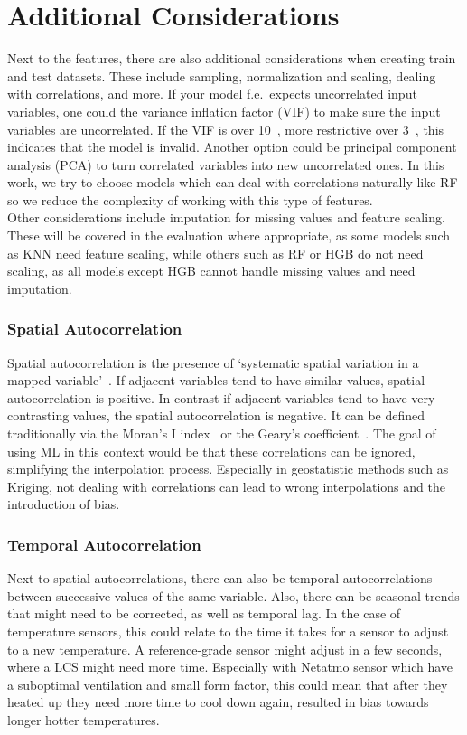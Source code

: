 \section{Additional Considerations}

Next to the features, there are also additional considerations when creating train and test datasets. These include sampling, normalization and scaling, dealing with correlations, and more. If your model f.e.\ expects uncorrelated input variables, one could the variance inflation factor (VIF) to make sure the input variables are uncorrelated. If the VIF is over 10~\cite{montgomery2021introduction}, more restrictive over 3~\cite{zuur2010protocol}, this indicates that the model is invalid. Another option could be principal component analysis (PCA) to turn correlated variables into new uncorrelated ones. In this work, we try to choose models which can deal with correlations naturally like RF so we reduce the complexity of working with this type of features.\\
Other considerations include imputation for missing values and feature scaling. These will be covered in the evaluation where appropriate, as some models such as KNN need feature scaling, while others such as RF or HGB do not need scaling, as all models except HGB cannot handle missing values and need imputation.

\subsubsection{Spatial Autocorrelation}

Spatial autocorrelation is the presence of `systematic spatial variation in a mapped variable'~\cite{haining2001spatial}. If adjacent variables tend to have similar values, spatial autocorrelation is positive. In contrast if adjacent variables tend to have very contrasting values, the spatial autocorrelation is negative. It can be defined traditionally via the Moran's I index~\cite{moran1948interpretation} or the Geary's coefficient~\cite{geary1954contiguity}. The goal of using ML in this context would be that these correlations can be ignored, simplifying the interpolation process. Especially in geostatistic methods such as Kriging, not dealing with correlations can lead to wrong interpolations and the introduction of bias.\\

\subsubsection{Temporal Autocorrelation}

Next to spatial autocorrelations, there can also be temporal autocorrelations between successive values of the same variable. Also, there can be seasonal trends that might need to be corrected, as well as temporal lag. In the case of temperature sensors, this could relate to the time it takes for a sensor to adjust to a new temperature. A reference-grade sensor might adjust in a few seconds, where a LCS might need more time. Especially with Netatmo sensor which have a suboptimal ventilation and small form factor, this could mean that after they heated up they need more time to cool down again, resulted in bias towards longer hotter temperatures.
